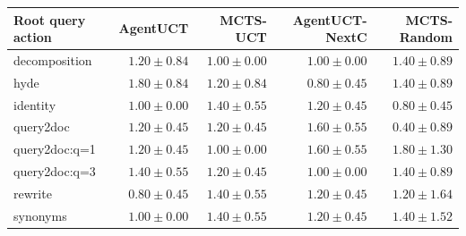 \begin{tabular}{@{}lrrrr@{}}
\toprule
Root query action & AgentUCT & MCTS-UCT & AgentUCT-NextC & MCTS-Random \\
\midrule
decomposition & $1.20 \pm 0.84$ & $1.00 \pm 0.00$ & $1.00 \pm 0.00$ & $1.40 \pm 0.89$ \\
hyde & $1.80 \pm 0.84$ & $1.20 \pm 0.84$ & $0.80 \pm 0.45$ & $1.40 \pm 0.89$ \\
identity & $1.00 \pm 0.00$ & $1.40 \pm 0.55$ & $1.20 \pm 0.45$ & $0.80 \pm 0.45$ \\
query2doc & $1.20 \pm 0.45$ & $1.20 \pm 0.45$ & $1.60 \pm 0.55$ & $0.40 \pm 0.89$ \\
query2doc:q=1 & $1.20 \pm 0.45$ & $1.00 \pm 0.00$ & $1.60 \pm 0.55$ & $1.80 \pm 1.30$ \\
query2doc:q=3 & $1.40 \pm 0.55$ & $1.20 \pm 0.45$ & $1.00 \pm 0.00$ & $1.40 \pm 0.89$ \\
rewrite & $0.80 \pm 0.45$ & $1.40 \pm 0.55$ & $1.20 \pm 0.45$ & $1.20 \pm 1.64$ \\
synonyms & $1.00 \pm 0.00$ & $1.40 \pm 0.55$ & $1.20 \pm 0.45$ & $1.40 \pm 1.52$ \\
\bottomrule
\end{tabular}
